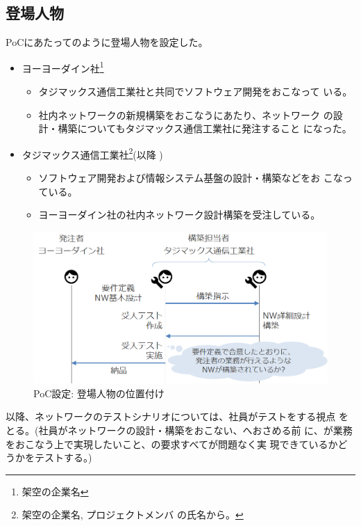   \subsection{登場人物}

PoCにあたってのように登場人物を設定した。
\begin{itemize}
 \item ヨーヨーダイン社\footnote{架空の企業名\cite{yoyodyne}}
       \begin{itemize}
        \item タジマックス通信工業社と共同でソフトウェア開発をおこなって
              いる。
        \item 社内ネットワークの新規構築をおこなうにあたり、ネットワーク
              の設計・構築についてもタジマックス通信工業社に発注すること
              になった。
       \end{itemize}
 \item タジマックス通信工業社\footnote{架空の企業名, プロジェクトメンバ
       の氏名から。}(以降 \tj )
       \begin{itemize}
        \item ソフトウェア開発および情報システム基盤の設計・構築などをお
              こなっている。
        \item ヨーヨーダイン社の社内ネットワーク設計構築を受注している。
       \end{itemize}
\end{itemize}

\begin{figure}[h]
 \centering
 \includegraphics[scale=0.5]{img/poc-situation.png}
 \caption{PoC設定: 登場人物の位置付け}
 \label{fig:poc-situation}
\end{figure}

以降、ネットワークのテストシナリオについては、\tj 社員がテストをする視点
をとる。(\tj 社員がネットワークの設計・構築をおこない、\yo へおさめる前
に、\yo が業務をおこなう上で実現したいこと、\yo の要求すべてが問題なく実
現できているかどうかをテストする。)

